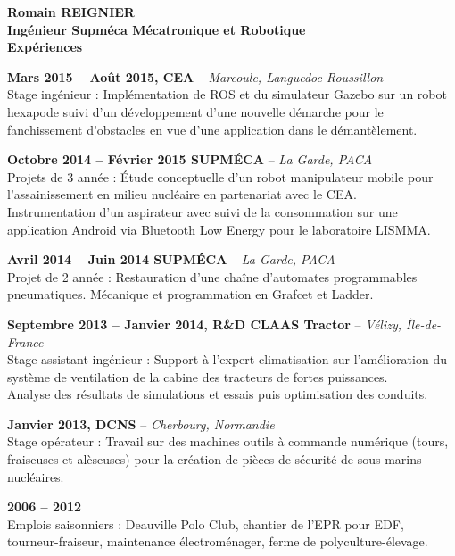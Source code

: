 \documentclass[a4paper,11pt,final]{memoir}
\newcommand{\Sep}{\vspace{1.5em}}
\newcommand{\SmallSep}{\vspace{0.5em}}
\newenvironment{AboutMe}
	{\ignorespaces}%
	{\SmallSep\ignorespacesafterend}
\newcommand{\CVSection}[1]
	{\Large\textbf{#1}\par
	\SmallSep\normalsize\normalfont}
\newcommand{\CVItem}[2]
	{\textbf{\color{RoyalBlue} #1 \color{dark_gray} #2}\normalsize\normalfont}
\newcommand{\city}[1]
	{{\small\color{dark_gray}\emph{#1}}\normalsize\normalfont}
\begin{document}
\Huge\bfseries {\color{RoyalBlue} Romain REIGNIER} \\
\Large\bfseries  Ingénieur Supméca Mécatronique et Robotique\\


\CVSection{Expériences}

\CVItem{Mars 2015 -- Août 2015,}{CEA} -- \city{Marcoule, Languedoc-Roussillon}\\
Stage ingénieur : Implémentation de ROS et du simulateur Gazebo sur un robot hexapode suivi d'un développement d'une nouvelle démarche pour le fanchissement d'obstacles en vue d'une application dans le démantèlement.
\SmallSep

\CVItem{Octobre 2014 -- Février 2015}{SUPMÉCA} -- \city{La Garde, PACA}\\
Projets de 3\ieme{} année : Étude conceptuelle d'un robot manipulateur mobile pour l'assainissement en milieu nucléaire en partenariat avec le CEA.\\
Instrumentation d'un aspirateur avec suivi de la consommation sur une application Android via Bluetooth Low Energy pour le laboratoire LISMMA.
\SmallSep

\CVItem{Avril 2014 -- Juin 2014}{SUPMÉCA} -- \city{La Garde, PACA}\\
Projet de 2\ieme{} année : Restauration d'une chaîne d'automates programmables pneumatiques. Mécanique et programmation en Grafcet et Ladder.
\SmallSep

\CVItem{Septembre 2013 -- Janvier 2014,}{R\&D CLAAS Tractor} -- \city{Vélizy, Île-de-France}\\
Stage assistant ingénieur : Support à l'expert climatisation sur l'amélioration du système de ventilation de la cabine des tracteurs de fortes puissances.\\
Analyse des résultats de simulations et essais puis optimisation des conduits.
\SmallSep

\CVItem{Janvier 2013,}{DCNS} -- \city{Cherbourg, Normandie}\\
Stage opérateur : Travail sur des machines outils à commande numérique (tours, fraiseuses et alèseuses) pour la création de pièces de sécurité de sous-marins nucléaires.
\SmallSep

\CVItem{2006 -- 2012}{}\\
Emplois saisonniers : Deauville Polo Club, chantier de l'EPR pour EDF, tourneur-fraiseur, maintenance électroménager, ferme de polyculture-élevage.
\Sep
\end{document}
